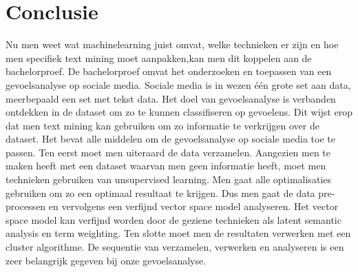 \chapter{Conclusie}\label{Conclusie}

Nu men weet wat machinelearning juist omvat, welke technieken er zijn en hoe men specifiek text mining moet aanpakken,kan men dit koppelen aan de bachelorproef. De bachelorproef omvat het onderzoeken en toepassen van een gevoelsanalyse op sociale media. Sociale media is in wezen \'e\'en grote set aan data, meerbepaald een set met tekst data. Het doel van gevoelsanalyse is verbanden ontdekken in de dataset om zo te kunnen classifiseren op gevoelens. Dit wijst erop dat men text mining kan gebruiken om zo informatie te verkrijgen over de dataset. Het bevat alle middelen om de gevoelsanalyse op sociale media toe te passen. Ten eerst moet men uiteraard de data verzamelen. Aangezien men te maken heeft met een dataset waarvan men geen informatie heeft, moet men technieken gebruiken van unsupervised learning. Men gaat alle optimalisaties gebruiken om zo een optimaal resultaat te krijgen. Dus men gaat de data pre-processen en vervolgens een verfijnd vector space model analyseren. Het vector space model kan verfijnd worden door de geziene technieken als latent semantic analysis en term weighting. Ten slotte moet men de resultaten verwerken met een cluster algorithme. De sequentie van verzamelen, verwerken en analyseren is een zeer belangrijk gegeven bij onze gevoelsanalyse.


